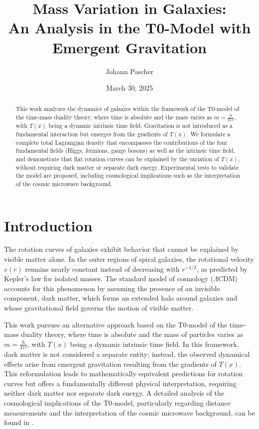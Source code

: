 \documentclass[a4paper,12pt]{article}
\newcommand{\Tfield}{T(x)}
\begin{document}
	
	\title{Mass Variation in Galaxies: \\An Analysis in the T0-Model with Emergent Gravitation}
	\author{Johann Pascher}
	\date{March 30, 2025}
	\maketitle
	
	\begin{abstract}
		This work analyzes the dynamics of galaxies within the framework of the T0-model of the time-mass duality theory, where time is absolute and the mass varies as \( m = \frac{\hbar}{T c^2} \), with \( \Tfield \) being a dynamic intrinsic time field. Gravitation is not introduced as a fundamental interaction but emerges from the gradients of \( \Tfield \). We formulate a complete total Lagrangian density that encompasses the contributions of the four fundamental fields (Higgs, fermions, gauge bosons) as well as the intrinsic time field, and demonstrate that flat rotation curves can be explained by the variation of \( \Tfield \), without requiring dark matter or separate dark energy. Experimental tests to validate the model are proposed, including cosmological implications such as the interpretation of the cosmic microwave background.
	\end{abstract}
	
	\tableofcontents
	\newpage
	
	\section{Introduction}
	
	The rotation curves of galaxies exhibit behavior that cannot be explained by visible matter alone. In the outer regions of spiral galaxies, the rotational velocity \( v(r) \) remains nearly constant instead of decreasing with \( r^{-1/2} \), as predicted by Kepler's law for isolated masses. The standard model of cosmology (\(\Lambda\)CDM) accounts for this phenomenon by assuming the presence of an invisible component, dark matter, which forms an extended halo around galaxies and whose gravitational field governs the motion of visible matter.
	
	This work pursues an alternative approach based on the T0-model of the time-mass duality theory, where time is absolute and the mass of particles varies as \( m = \frac{\hbar}{T c^2} \), with \( \Tfield \) being a dynamic intrinsic time field. In this framework, dark matter is not considered a separate entity; instead, the observed dynamical effects arise from emergent gravitation resulting from the gradients of \( \Tfield \). This reformulation leads to mathematically equivalent predictions for rotation curves but offers a fundamentally different physical interpretation, requiring neither dark matter nor separate dark energy. A detailed analysis of the cosmological implications of the T0-model, particularly regarding distance measurements and the interpretation of the cosmic microwave background, can be found in \cite{pascher_messdifferenzen_2025}.
	
\end{document}
